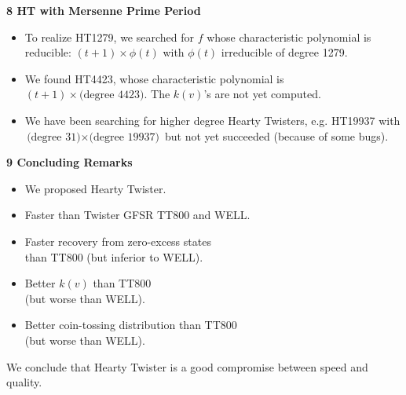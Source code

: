 \documentclass[a4j,12pt,landscape]{jarticle}
\begin{document}
{\begin{center}
\end{center}


\newpage
\noindent
{\bf 8 HT with Mersenne Prime Period}\\
\begin{itemize}
\item To realize HT1279, we searched for $f$ whose
characteristic polynomial is reducible: 
$(t+1)\times \phi(t)$ with $\phi(t)$ irreducible of degree 1279.
\item We found HT4423, whose characteristic polynomial is \\
$(t+1)\times \mbox{(degree 4423)}$. The $k(v)$'s are not yet computed. 
\item We have been searching for higher degree Hearty Twisters,
e.g. HT19937 with $\mbox{(degree 31)} \times \mbox{(degree 19937)}$
but not yet succeeded (because of some bugs).
\end{itemize}

\newpage
\noindent
{\bf 9 Concluding Remarks}
\begin{itemize}
\item We proposed Hearty Twister. 
\item Faster than Twister GFSR TT800 and WELL.
\item Faster recovery from zero-excess states \\
than TT800 (but inferior to WELL). 
\item Better $k(v)$ than TT800 \\
(but worse than WELL).
\item Better coin-tossing distribution than TT800 \\
(but worse than WELL).
\end{itemize}
We conclude that Hearty Twister is a good compromise
between speed and quality. 

%
%
%

}
\end{document}
